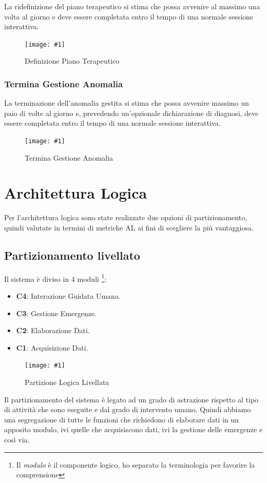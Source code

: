 \documentclass[a4paper,11pt,oneside, table]{article}
\newcommand{\putimage}[4] {
	\begin{figure}[H]
	    \centering
	    \texttt{[image: \#1]}
	    \caption{#2}\label{#3}
	\end{figure}
}
\newcommand{\bigimage}[4] {
	\begin{figure}[H]
	    \centering
	    \texttt{[image: \#1]}
	    \caption{#2}\label{#3}
	\end{figure}
}
\begin{document}
La ridefinizione del piano terapeutico si stima che possa avvenire al massimo una volta al giorno e deve essere completata entro il tempo di una normale sessione interattiva.

\putimage{images/Diagramma delle Attivita'/Definizione Piano Terapeutico.png}{Definizione Piano Terapeutico}{png:act:definizione-piano-terapeutico}{1}

\subsubsection{Termina Gestione Anomalia}

La terminazione dell'anomalia gestita si stima che possa avvenire massimo un paio di volte al giorno e, prevedendo un'opzionale dichiarazione di diagnosi, deve essere completata entro il tempo di una normale sessione interattiva.

\putimage{images/Diagramma delle Attivita'/Termina Gestione Anomalia.png}{Termina Gestione Anomalia}{png:act:termina-gestione-anomalia}{1}

\section{Architettura Logica}

Per l'architettura logica sono state realizzate due opzioni di partizionamento, quindi valutate in termini di metriche AL ai fini di scegliere la pi\`u vantaggiosa.

\subsection{Partizionamento livellato}

Il sistema \`e diviso in 4 moduli \footnote{Il \textit{modulo} \`e il componente logico, ho separato la terminologia per favorire la comprensione}:
\begin{itemize}
  \item \textbf{C4}: Interazione Guidata Umana.
  \item \textbf{C3}: Gestione Emergenze.
  \item \textbf{C2}: Elaborazione Dati.
  \item \textbf{C1}: Acquisizione Dati.
\end{itemize}

\bigimage{images/Diagramma delle Attivita'/Partizione Logica Livellata.png}{Partizione Logica Livellata}{png:act:partizione-logica-livellata}{1}

Il partizionamento del sistema \`e legato ad un grado di astrazione rispetto al tipo di attivit\`a che sono eseguite e dal grado di intervento umano. Quindi abbiamo una segregazione di tutte le funzioni che richiedono di elaborare dati in un apposito modulo, ivi quelle che acquisiscono dati, ivi la gestione delle emergenze e cos\`i via.
\end{document}
